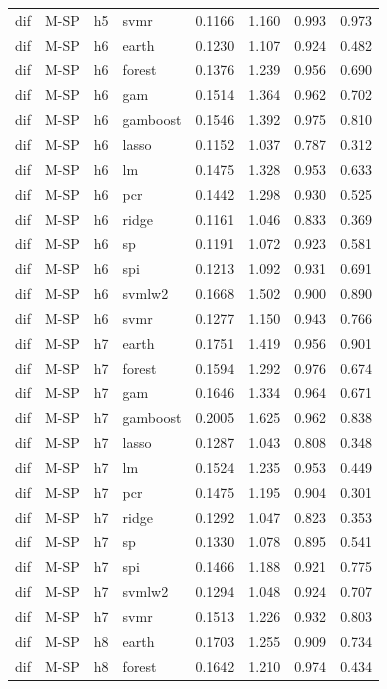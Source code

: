 \begin{ThreePartTable}
\begin{longtable}[t]{llclcccc}
dif & M-SP & h5 & svmr & 0.1166 & 1.160 & 0.993 & 0.973\\
\addlinespace
dif & M-SP & h6 & earth & 0.1230 & 1.107 & 0.924 & 0.482\\
dif & M-SP & h6 & forest & 0.1376 & 1.239 & 0.956 & 0.690\\
dif & M-SP & h6 & gam & 0.1514 & 1.364 & 0.962 & 0.702\\
dif & M-SP & h6 & gamboost & 0.1546 & 1.392 & 0.975 & 0.810\\
dif & M-SP & h6 & lasso & 0.1152 & 1.037 & 0.787 & 0.312\\
dif & M-SP & h6 & lm & 0.1475 & 1.328 & 0.953 & 0.633\\
dif & M-SP & h6 & pcr & 0.1442 & 1.298 & 0.930 & 0.525\\
dif & M-SP & h6 & ridge & 0.1161 & 1.046 & 0.833 & 0.369\\
dif & M-SP & h6 & sp & 0.1191 & 1.072 & 0.923 & 0.581\\
dif & M-SP & h6 & spi & 0.1213 & 1.092 & 0.931 & 0.691\\
dif & M-SP & h6 & svmlw2 & 0.1668 & 1.502 & 0.900 & 0.890\\
dif & M-SP & h6 & svmr & 0.1277 & 1.150 & 0.943 & 0.766\\
\addlinespace
dif & M-SP & h7 & earth & 0.1751 & 1.419 & 0.956 & 0.901\\
dif & M-SP & h7 & forest & 0.1594 & 1.292 & 0.976 & 0.674\\
dif & M-SP & h7 & gam & 0.1646 & 1.334 & 0.964 & 0.671\\
dif & M-SP & h7 & gamboost & 0.2005 & 1.625 & 0.962 & 0.838\\
dif & M-SP & h7 & lasso & 0.1287 & 1.043 & 0.808 & 0.348\\
dif & M-SP & h7 & lm & 0.1524 & 1.235 & 0.953 & 0.449\\
dif & M-SP & h7 & pcr & 0.1475 & 1.195 & 0.904 & 0.301\\
dif & M-SP & h7 & ridge & 0.1292 & 1.047 & 0.823 & 0.353\\
dif & M-SP & h7 & sp & 0.1330 & 1.078 & 0.895 & 0.541\\
dif & M-SP & h7 & spi & 0.1466 & 1.188 & 0.921 & 0.775\\
dif & M-SP & h7 & svmlw2 & 0.1294 & 1.048 & 0.924 & 0.707\\
dif & M-SP & h7 & svmr & 0.1513 & 1.226 & 0.932 & 0.803\\
\addlinespace
dif & M-SP & h8 & earth & 0.1703 & 1.255 & 0.909 & 0.734\\
dif & M-SP & h8 & forest & 0.1642 & 1.210 & 0.974 & 0.434\\

\end{longtable}
\end{ThreePartTable}
